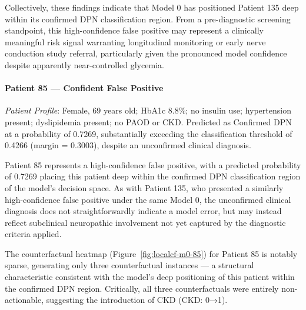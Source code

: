 \documentclass[pdflatex,sn-vancouver-num]{sn-jnl}
\begin{document}
Collectively, these findings indicate that Model 0 has positioned Patient 135 deep within its confirmed DPN classification region. From a pre-diagnostic screening standpoint, this high-confidence false positive may represent a clinically meaningful risk signal warranting longitudinal monitoring or early nerve conduction study referral, particularly given the pronounced model confidence despite apparently near-controlled glycemia.

\paragraph{Patient 85 --- Confident False Positive}
\textit{Patient Profile}: Female, 69 years old; HbA1c 8.8\%; no insulin use; hypertension present; dyslipidemia present; no PAOD or CKD. Predicted as Confirmed DPN at a probability of 0.7269, substantially exceeding the classification threshold of 0.4266 (margin = 0.3003), despite an unconfirmed clinical diagnosis. 

Patient 85 represents a high-confidence false positive, with a predicted probability of 0.7269 placing this patient deep within the confirmed DPN classification region of the model's decision space. 
As with Patient 135, who presented a similarly high-confidence false positive under the same Model 0, the unconfirmed clinical diagnosis does not straightforwardly indicate a model error, but may instead reflect subclinical neuropathic involvement not yet captured by the diagnostic criteria applied.

The counterfactual heatmap (Figure~\ref{fig:localcf-m0-85}) for Patient 85 is notably sparse, generating only three counterfactual instances — a structural characteristic consistent with the model's deep positioning of this patient within the confirmed DPN region. Critically, all three counterfactuals were entirely non-actionable, suggesting the introduction of CKD (CKD: 0→1).
\end{document}
